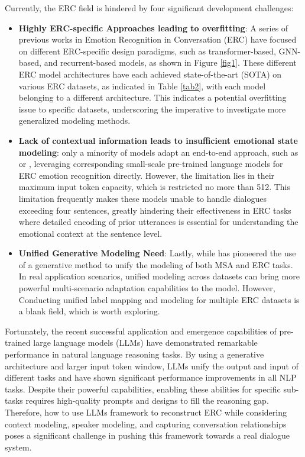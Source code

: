 \documentclass[conference]{IEEEtran}
\begin{document}
Currently, the ERC field is hindered by four significant development challenges: 
\begin{itemize}


\item \textbf{Highly ERC-specific Approaches leading to overfitting}:
A series of previous works in Emotion Recognition in Conversation (ERC) have focused on different ERC-specific design paradigms, such as transformer-based, GNN-based, and recurrent-based models, as shown in Figure \ref{fig1}. These different ERC model architectures have each achieved state-of-the-art (SOTA) on various ERC datasets, as indicated in Table \ref{tab2}, with each model belonging to a different architecture. This indicates a potential overfitting issue to specific datasets, underscoring the imperative to investigate more generalized modeling methods.


\item \textbf{Lack of contextual information leads to insufficient emotional state modeling}: only a minority of models adapt an end-to-end approach, such as \cite{shen2021dialogxl} or \cite{kim2021emoberta}, leveraging corresponding small-scale pre-trained language models for ERC emotion recognition directly. However, the limitation lies in their maximum input token capacity, which is restricted no more than 512. This limitation frequently makes these models unable to handle dialogues exceeding four sentences, greatly hindering their effectiveness in ERC tasks where detailed encoding of prior utterances is essential for understanding the emotional context at the sentence level.




\item \textbf{Unified Generative Modeling Need}: Lastly, while \cite{hu-etal-2022-unimse} has pioneered the use of a generative method to unify the modeling of both MSA and ERC tasks. 
In real application scenarios, unified modeling across datasets can bring more powerful multi-scenario adaptation capabilities to the model. However, Conducting unified label mapping and modeling for multiple ERC datasets is a blank field, which is worth exploring.


\end{itemize}








Fortunately, the recent successful application and emergence capabilities of pre-trained large language models (LLMs) have demonstrated remarkable performance in natural language reasoning tasks. By using a generative architecture and larger input token window, LLMs unify the output and input of different tasks and have shown significant performance improvements in all NLP tasks. Despite their powerful capabilities, enabling these abilities for specific sub-tasks requires high-quality prompts \cite{wei2021finetuned,chung2022scaling} and designs to fill the reasoning gap. 
Therefore, how to use LLMs framework to reconstruct ERC while considering context modeling, speaker modeling, and capturing conversation relationships poses a significant challenge in pushing this framework towards a real dialogue system.
\end{document}
